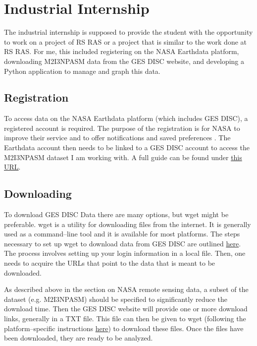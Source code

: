 \documentclass[../00_main.tex]{subfiles}
\begin{document}
\section{Industrial Internship}

The industrial internship is supposed to provide the student with the
opportunity to work on a project of RS RAS or a project that is similar to the
work done at RS RAS. For me, this included registering on the NASA Earthdata
platform, downloading M2I3NPASM data from the GES DISC website, and developing
a Python application to manage and graph this data.

\subsection{Registration}

To access data on the NASA Earthdata platform (which includes GES DISC),
a registered account is required. The purpose of the registration is for NASA
to improve their service and to offer notifications and saved preferences
\cite{earthdata-policy}. The Earthdata account then needs to be linked to a 
GES DISC account to access the M2I3NPASM dataset I am working with. A full 
guide can be found under 
\href{https://www.unidata.ucar.edu/software/netcdf/}{this URL}.

\subsection{Downloading}

To download GES DISC Data there are many options, but wget might be preferable. 
wget is a utility for downloading files from the internet. It is generally used 
as a command--line tool and it is available for most platforms. The steps 
necessary to set up wget to download data from GES DISC are outlined 
\href{https://disc.gsfc.nasa.gov/data-access#mac_linux_wget}{here}. The process
involves setting up your login information in a local file. Then, one needs to 
acquire the URLs that point to the data that is meant to be downloaded.\newline

As described above in the section on NASA remote sensing data,
a subset of the dataset (e.g. M2I3NPASM) should be specified to significantly
reduce the download time. Then the GES DISC website will provide one or more
download links, generally in a TXT file. This file can then be given to wget 
(following the platform--specific instructions 
\href{https://disc.gsfc.nasa.gov/data-access#mac_linux_wget}{here}) to download
these files. Once the files have been downloaded, they are ready to be 
analyzed. 
\end{document}
